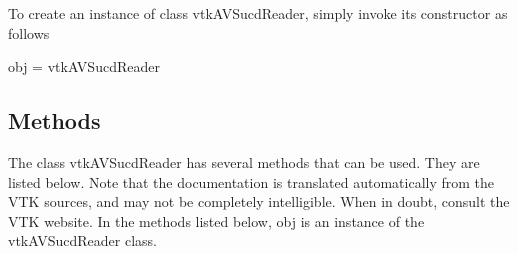 To create an instance of class vtk\-A\-V\-Sucd\-Reader, simply invoke its constructor as follows \begin{DoxyVerb}  obj = vtkAVSucdReader
\end{DoxyVerb}
 \hypertarget{vtkwidgets_vtkxyplotwidget_Methods}{}\subsection{Methods}\label{vtkwidgets_vtkxyplotwidget_Methods}
The class vtk\-A\-V\-Sucd\-Reader has several methods that can be used. They are listed below. Note that the documentation is translated automatically from the V\-T\-K sources, and may not be completely intelligible. When in doubt, consult the V\-T\-K website. In the methods listed below, {\ttfamily obj} is an instance of the vtk\-A\-V\-Sucd\-Reader class. 
